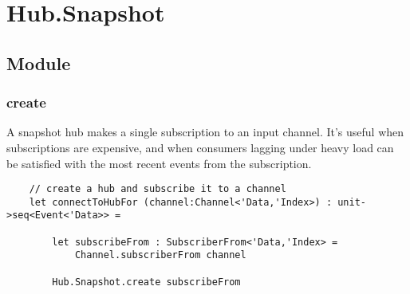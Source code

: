 \documentclass{article}
\begin{document}

\clearpage
\section{Hub.Snapshot}
\subsection{Module}
\subsubsection{create}

A snapshot hub makes a single subscription to an input channel.  It's useful when subscriptions are expensive, and when consumers lagging under heavy load can be satisfied with the most recent events from the subscription.

\begin{verbatim}
    // create a hub and subscribe it to a channel
    let connectToHubFor (channel:Channel<'Data,'Index>) : unit->seq<Event<'Data>> =
    
        let subscribeFrom : SubscriberFrom<'Data,'Index> =
            Channel.subscriberFrom channel
    
        Hub.Snapshot.create subscribeFrom
\end{verbatim}
\end{document}
